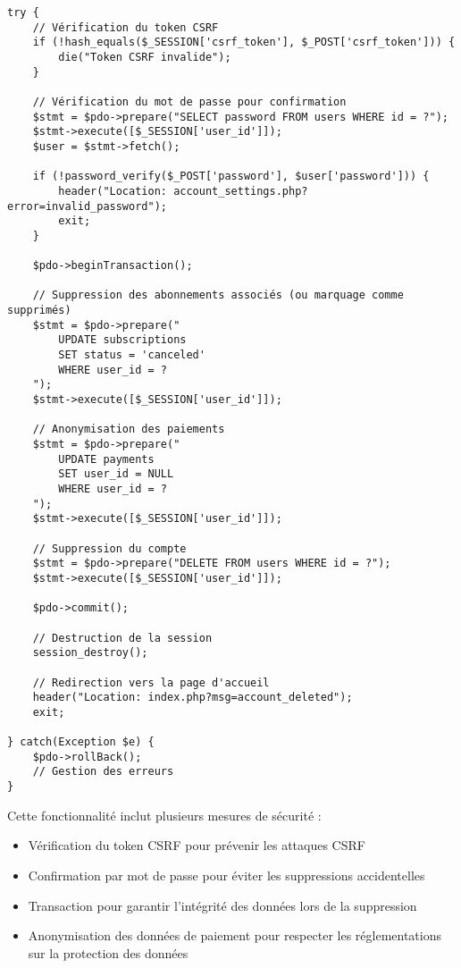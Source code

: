 \documentclass[12pt,a4paper]{report}
\begin{document}
\begin{lstlisting}[style=phpStyle, caption=Extrait de delete\_account.php - Suppression de compte]
try {
    // Vérification du token CSRF
    if (!hash_equals($_SESSION['csrf_token'], $_POST['csrf_token'])) {
        die("Token CSRF invalide");
    }
    
    // Vérification du mot de passe pour confirmation
    $stmt = $pdo->prepare("SELECT password FROM users WHERE id = ?");
    $stmt->execute([$_SESSION['user_id']]);
    $user = $stmt->fetch();
    
    if (!password_verify($_POST['password'], $user['password'])) {
        header("Location: account_settings.php?error=invalid_password");
        exit;
    }
    
    $pdo->beginTransaction();
    
    // Suppression des abonnements associés (ou marquage comme supprimés)
    $stmt = $pdo->prepare("
        UPDATE subscriptions 
        SET status = 'canceled'
        WHERE user_id = ?
    ");
    $stmt->execute([$_SESSION['user_id']]);
    
    // Anonymisation des paiements
    $stmt = $pdo->prepare("
        UPDATE payments 
        SET user_id = NULL
        WHERE user_id = ?
    ");
    $stmt->execute([$_SESSION['user_id']]);
    
    // Suppression du compte
    $stmt = $pdo->prepare("DELETE FROM users WHERE id = ?");
    $stmt->execute([$_SESSION['user_id']]);
    
    $pdo->commit();
    
    // Destruction de la session
    session_destroy();
    
    // Redirection vers la page d'accueil
    header("Location: index.php?msg=account_deleted");
    exit;
    
} catch(Exception $e) {
    $pdo->rollBack();
    // Gestion des erreurs
}
\end{lstlisting}

Cette fonctionnalité inclut plusieurs mesures de sécurité :
\begin{itemize}
    \item Vérification du token CSRF pour prévenir les attaques CSRF
    \item Confirmation par mot de passe pour éviter les suppressions accidentelles
    \item Transaction pour garantir l'intégrité des données lors de la suppression
    \item Anonymisation des données de paiement pour respecter les réglementations sur la protection des données
\end{itemize}
\end{document}
